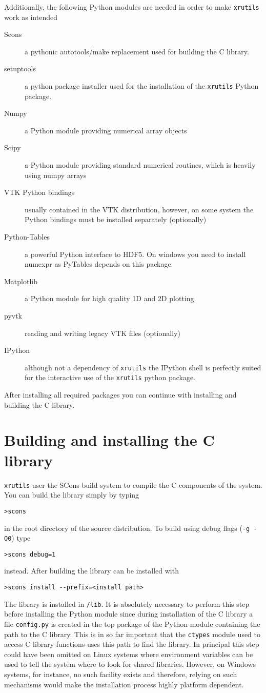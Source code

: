 Additionally, the following Python modules are needed in order to make 
{\tt xrutils} work as intended
\begin{description}
\item[Scons] a pythonic autotools/make replacement used for building the C library.
\item[setuptools] a python package installer used for the installation of the {\tt xrutils} Python package.
\item[Numpy] a Python module providing numerical array objects
\item[Scipy] a Python module providing standard numerical routines, which is heavily using numpy arrays
\item[VTK Python bindings] usually contained in the VTK distribution, however,
on some system the Python bindings must be installed separately (optionally)
\item[Python-Tables] a powerful Python interface to HDF5. On windows you need to install numexpr as PyTables depends on this package.
\item[Matplotlib] a Python module for high quality 1D and 2D plotting
\item[pyvtk] reading and writing legacy VTK files (optionally)
\item[IPython] although not a dependency of {\tt xrutils} the IPython shell is perfectly suited for the interactive use of the {\tt xrutils} python package.
\end{description}
After installing all required packages you can continue with installing and
building the C library.

\section{Building and installing the C library}

{\tt xrutils} user the SCons build system to compile the C components of the
system. You can build the library simply by typing 
\begin{verbatim}
>scons
\end{verbatim}
in the root directory of the source distribution. To build using debug flags ({\tt -g -O0}) type
\begin{verbatim}
>scons debug=1
\end{verbatim}
instead. After building the library can be installed with
\begin{verbatim}
>scons install --prefix=<install path>
\end{verbatim}
The library is installed in {\tt<install path>/lib}. It is absolutely necessary
to perform this step before installing the Python module since during
installation of the C library a file {\tt config.py} is created in the top
package of the Python module containing the path to the C library. This is in so
far important that the {\tt ctypes} module used to access C library functions
uses this path to find the library. In principal this step could have been
omitted on Linux systems where environment variables can be used to tell the
system where to look for shared libraries. However, on Windows systems, for
instance, no such facility exists and therefore, relying on such mechanisms
would make the installation process highly platform dependent. 

